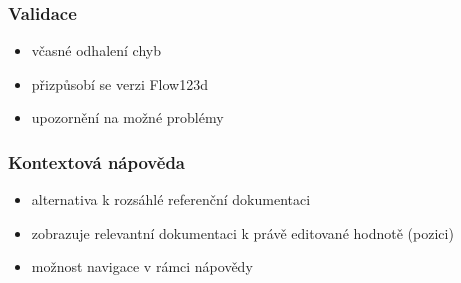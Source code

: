 \begin{frame}
	\frametitle{Validace}
	\begin{itemize}[<+->]
	\item včasné odhalení chyb
	\item přizpůsobí se verzi Flow123d
	\item upozornění na možné problémy
	\end{itemize}
\end{frame}


\begin{frame}
	\frametitle{Kontextová nápověda}
	\begin{itemize}[<+->]
	\item alternativa k rozsáhlé referenční dokumentaci
	\item zobrazuje relevantní dokumentaci k právě editované hodnotě (pozici)
	\item možnost navigace v rámci nápovědy
	\end{itemize}
\end{frame}

